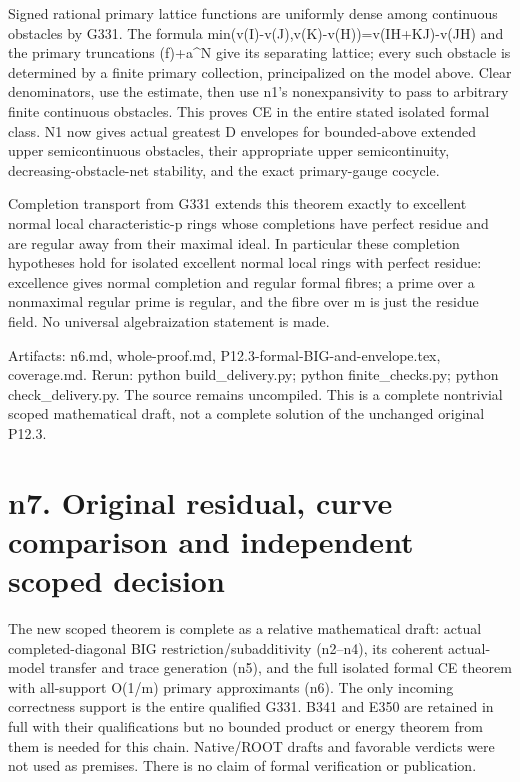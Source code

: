 \documentclass[11pt]{article}
\begin{document}
Signed rational primary lattice functions are uniformly dense among continuous obstacles by G331. The formula min(v(I)-v(J),v(K)-v(H))=v(IH+KJ)-v(JH) and the primary truncations (f)+a\textasciicircum{}N give its separating lattice; every such obstacle is determined by a finite primary collection, principalized on the model above. Clear denominators, use the estimate, then use n1's nonexpansivity to pass to arbitrary finite continuous obstacles. This proves CE in the entire stated isolated formal class. N1 now gives actual greatest D envelopes for bounded-above extended upper semicontinuous obstacles, their appropriate upper semicontinuity, decreasing-obstacle-net stability, and the exact primary-gauge cocycle.

Completion transport from G331 extends this theorem exactly to excellent normal local characteristic-p rings whose completions have perfect residue and are regular away from their maximal ideal. In particular these completion hypotheses hold for isolated excellent normal local rings with perfect residue: excellence gives normal completion and regular formal fibres; a prime over a nonmaximal regular prime is regular, and the fibre over m is just the residue field. No universal algebraization statement is made.

Artifacts: n6.md, whole-proof.md, P12.3-formal-BIG-and-envelope.tex, coverage.md. Rerun: python build\_delivery.py; python finite\_checks.py; python check\_delivery.py. The source remains uncompiled. This is a complete nontrivial scoped mathematical draft, not a complete solution of the unchanged original P12.3.

\section{n7. Original residual, curve comparison and independent scoped decision}

The new scoped theorem is complete as a relative mathematical draft: actual completed-diagonal BIG restriction/subadditivity (n2--n4), its coherent actual-model transfer and trace generation (n5), and the full isolated formal CE theorem with all-support O(1/m) primary approximants (n6). The only incoming correctness support is the entire qualified G331. B341 and E350 are retained in full with their qualifications but no bounded product or energy theorem from them is needed for this chain. Native/ROOT drafts and favorable verdicts were not used as premises. There is no claim of formal verification or publication.
\end{document}
